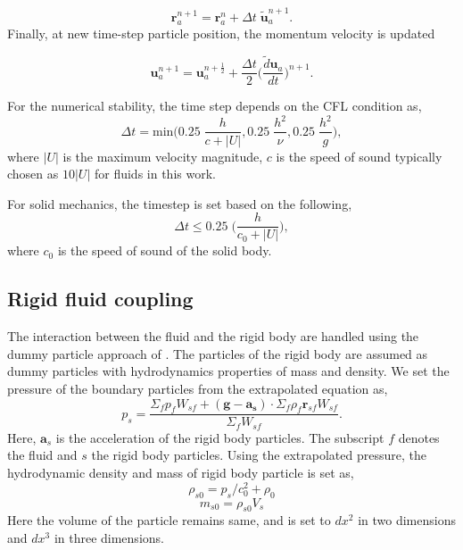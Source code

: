\documentclass[preprint,12pt]{elsarticle}
\newcommand{\ten}[1]{\ensuremath{\mathbf{#1}}}
\begin{document}
\begin{equation}
  \label{eq:position-update-stage-2}
  \ten{r}_{a}^{n+1} = \ten{r}_{a}^{n} + \Delta t \; \ten{\tilde{u}}_{a}^{n+1}.
\end{equation}
%
Finally, at new time-step particle position, the momentum velocity is updated

\begin{equation}
  \label{eq:velocity-update-stage-3}
  \ten{u}_a^{n+1} = \ten{u}_a^{n+\frac{1}{2}} + \frac{\Delta t}{2} \bigg(\frac{\tilde{d}\ten{u}_{a}}{dt}\bigg)^{n+1}.
\end{equation}


For the numerical stability, the time step depends on the CFL condition as,
\begin{equation}
  \label{eq:time-step-cfl}
  \Delta t = \mathrm{min} \bigg( 0.25 \; \frac{h}{c + |U|} ,  0.25 \; \frac{h^2}{\nu},  0.25 \; \frac{h^2}{g} \bigg),
\end{equation}
where $|U|$ is the maximum velocity magnitude, $c$ is the speed of sound
typically chosen as $10 |U|$ for fluids in this work.

%
For solid mechanics, the timestep is set based on the following,
\begin{equation}
  \label{eq:time-step-body-force}
  \Delta t \leq 0.25 \; \bigg(\frac{h}{c_0 + |U|} \bigg),
\end{equation}
where $c_0$ is the speed of sound of the solid body.

\FloatBarrier%
\subsection{Rigid fluid coupling}\label{subsec:rfc}
The interaction between the fluid and the rigid body are handled using the
dummy particle approach of \cite{Adami2012}. The particles of the rigid body are
assumed as dummy particles with hydrodynamics properties of mass and density.
We set the pressure of the boundary particles from the extrapolated equation
\cite{Adami2012} as,
\begin{equation}
  \label{eq:pressure-bc}
  p_s = \frac{\Sigma_f p_f W_{sf} + (\ten{g} - \ten{a}_{\ten{s}}) \cdot \Sigma_f
    \rho_f \ten{r}_{sf} W_{sf}}{\Sigma_f W_{sf}}.
\end{equation}
Here, $\ten{a}_s$ is the acceleration of the rigid body particles. The
subscript $f$ denotes the fluid and $s$ the rigid body particles. Using the
extrapolated pressure, the hydrodynamic density and mass of rigid body
particle is set as,
\begin{equation}
  \label{eq:pressure-bc}
  \rho_{s0} = p_s / c_0^2 + \rho_0
\end{equation}
\begin{equation}
  \label{eq:pressure-bc}
  m_{s0} = \rho_{s0} V_{s}
\end{equation}
Here the volume of the particle remains same, and is set to $dx^2$ in two
dimensions and $dx^3$ in three dimensions.
\end{document}
